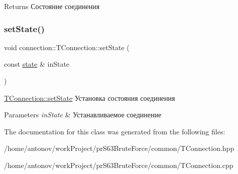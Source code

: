 \begin{DoxyReturn}{Returns}
Состояние соединения 
\end{DoxyReturn}
\mbox{\label{classconnection_1_1_t_connection_aa61ae6037f6b70cd97c9fc9c04f43629}} 
\subsubsection{\texorpdfstring{set\+State()}{setState()}}
{\footnotesize\ttfamily void connection\+::\+T\+Connection\+::set\+State (\begin{DoxyParamCaption}\item[{const \hyperlink{classconnection_1_1_t_connection_aee7dfb7510592bd2697ab6f906b9612c}{state} \&}]{in\+State }\end{DoxyParamCaption})}



\hyperlink{classconnection_1_1_t_connection_aa61ae6037f6b70cd97c9fc9c04f43629}{T\+Connection\+::set\+State} Установка состояния соединения 


\begin{DoxyParams}{Parameters}
{\em in\+State} & Устанавливаемое соединение \\
\hline
\end{DoxyParams}


The documentation for this class was generated from the following files\+:\begin{DoxyCompactItemize}
\item 
/home/antonov/work\+Project/pr\+S63\+Brute\+Force/common/T\+Connection.\+hpp\item 
/home/antonov/work\+Project/pr\+S63\+Brute\+Force/common/T\+Connection.\+cpp\end{DoxyCompactItemize}

